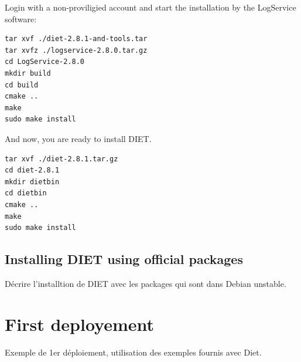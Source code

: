 \documentclass[12pt,a4paper]{book}
\begin{document}
\noindent Login with a non-proviligied account and start the installation by the LogService software:
\begin{verbatim}
tar xvf ./diet-2.8.1-and-tools.tar
tar xvfz ./logservice-2.8.0.tar.gz
cd LogService-2.8.0
mkdir build
cd build
cmake ..
make
sudo make install
\end{verbatim}

\noindent And now, you are ready to install DIET.
\begin{verbatim}
tar xvf ./diet-2.8.1.tar.gz
cd diet-2.8.1
mkdir dietbin
cd dietbin
cmake ..
make
sudo make install
\end{verbatim}

\subsection*{Installing DIET using official packages}
D\'ecrire l'installtion de DIET avec les packages qui sont dans Debian unstable.

\section*{First deployement}
Exemple de 1er d\'eploiement, utilisation des exemples fournis avec Diet.
\end{document}
